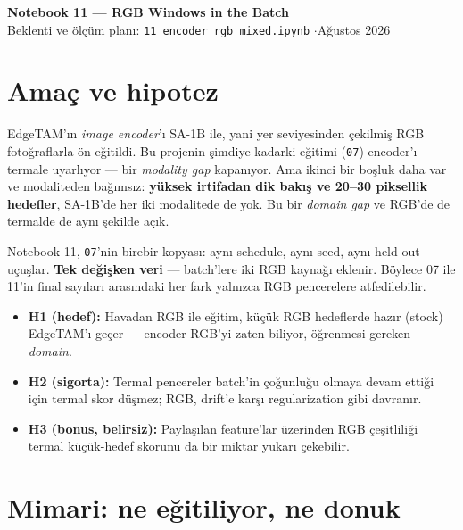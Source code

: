 \documentclass[11pt, paper=a4, DIV=14, parskip=half, numbers=noenddot]{scrartcl}
\newcommand{\code}[1]{\texttt{\small #1}}
\begin{document}
\begin{center}
  {\LARGE\sffamily\bfseries\color{anarenk}
   Notebook 11 --- RGB Windows in the Batch}\\[3pt]
  {\sffamily Beklenti ve ölçüm planı: \code{11\_encoder\_rgb\_mixed.ipynb}
   \quad$\cdot$\quad Ağustos 2026}
\end{center}
\vspace{2pt}

\section{Amaç ve hipotez}

EdgeTAM'ın \emph{image encoder}'ı SA-1B ile, yani yer seviyesinden çekilmiş
RGB fotoğraflarla ön-eğitildi. Bu projenin şimdiye kadarki eğitimi
(\code{07}) encoder'ı termale uyarlıyor --- bir \emph{modality gap}
kapanıyor. Ama ikinci bir boşluk daha var ve modaliteden bağımsız:
\textbf{yüksek irtifadan dik bakış ve 20--30 piksellik hedefler}, SA-1B'de
her iki modalitede de yok. Bu bir \emph{domain gap} ve RGB'de de termalde de
aynı şekilde açık.

Notebook 11, \code{07}'nin birebir kopyası: aynı schedule, aynı seed, aynı
held-out uçuşlar. \textbf{Tek değişken veri} --- batch'lere iki RGB kaynağı
eklenir. Böylece 07 ile 11'in final sayıları arasındaki her fark yalnızca RGB
pencerelere atfedilebilir.

\begin{itemize}\itemsep2pt
  \item \textbf{H1 (hedef):} Havadan RGB ile eğitim, küçük RGB hedeflerde
        hazır (stock) EdgeTAM'ı geçer --- encoder RGB'yi zaten biliyor,
        öğrenmesi gereken \emph{domain}.
  \item \textbf{H2 (sigorta):} Termal pencereler batch'in çoğunluğu olmaya
        devam ettiği için termal skor düşmez; RGB, drift'e karşı
        regularization gibi davranır.
  \item \textbf{H3 (bonus, belirsiz):} Paylaşılan feature'lar üzerinden RGB
        çeşitliliği termal küçük-hedef skorunu da bir miktar yukarı çekebilir.
\end{itemize}

\section{Mimari: ne eğitiliyor, ne donuk}
\end{document}
